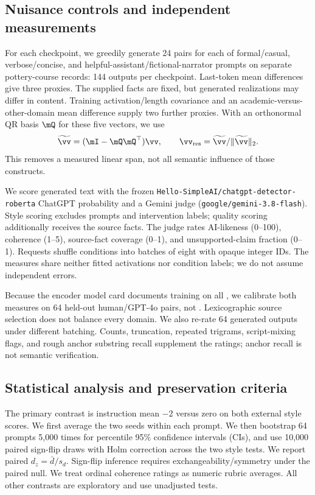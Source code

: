 \subsection{Nuisance controls and independent measurements}
For each checkpoint, we greedily generate 24 pairs for each of formal/casual, verbose/concise, and helpful-assistant/fictional-narrator prompts on separate pottery-course records: 144 outputs per checkpoint. Last-token mean differences give three proxies. The supplied facts are fixed, but generated realizations may differ in content. Training activation/length covariance and an academic-versus-other-domain mean difference supply two further proxies. With an orthonormal QR basis $\mQ$ for these five vectors, we use
\begin{equation}
\widetilde{\vv}=(\mI-\mQ\mQ^\top)\vv,\qquad
\vv_{\mathrm{res}}=\widetilde{\vv}/\|\widetilde{\vv}\|_2.
\end{equation}
This removes a measured linear span, not all semantic influence of those constructs.

We score generated text with the frozen \texttt{Hello-SimpleAI/chatgpt-detector-roberta} ChatGPT probability \cite{detectorcard} and a Gemini judge (\texttt{google/gemini-3.8-flash}). Style scoring excludes prompts and intervention labels; quality scoring additionally receives the source facts. The judge rates AI-likeness (0--100), coherence (1--5), source-fact coverage (0--1), and unsupported-claim fraction (0--1). Requests shuffle conditions into batches of eight with opaque integer IDs. The measures share neither fitted activations nor condition labels; we do not assume independent errors.

Because the encoder model card documents training on all \hcthree, we calibrate both measures on 64 held-out \hape human/GPT-4o pairs, not \hcthree. Lexicographic source selection does not balance every domain. We also re-rate 64 generated outputs under different batching. Counts, truncation, repeated trigrams, script-mixing flags, and rough anchor substring recall supplement the ratings; anchor recall is not semantic verification.

\subsection{Statistical analysis and preservation criteria}
The primary contrast is instruction mean $-2$ versus zero on both external style scores. We first average the two seeds within each prompt. We then bootstrap 64 prompts 5,000 times for percentile 95\% confidence intervals (CIs), and use 10,000 paired sign-flip draws with Holm correction across the two style tests. We report paired $d_z=\bar d/s_d$. Sign-flip inference requires exchangeability/symmetry under the paired null. We treat ordinal coherence ratings as numeric rubric averages. All other contrasts are exploratory and use unadjusted tests.

